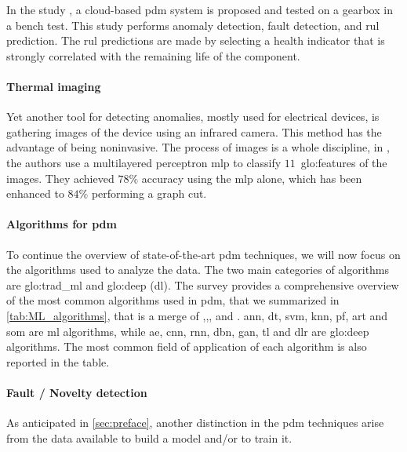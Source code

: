 In the study \cite{calabreseRUL}, a cloud-based \gls{pdm} system is proposed and tested on a gearbox in a bench test. This study performs anomaly detection, fault detection, and \gls{rul} prediction. The \gls{rul} predictions are made by selecting a health indicator that is strongly correlated with the remaining life of the component.


\paragraph{Thermal imaging}
Yet another tool for detecting anomalies, mostly used for electrical devices, is gathering images of the device using an infrared camera. This method has the advantage of being noninvasive. The process of images is a whole discipline, in \cite{Thermography}, the authors use a multilayered perceptron \gls{mlp} to classify $11$~\gls{glo:feature}s of the images. They achieved $78\%$ accuracy using the \gls{mlp} alone, which has been enhanced to $84\%$ performing a graph cut.

\paragraph{Algorithms for \gls{pdm}}
To continue the overview of state-of-the-art \gls{pdm} techniques, we will now focus on the algorithms used to analyze the data. The two main categories of algorithms are \gls{glo:trad_ml} and \gls{glo:deep} (\gls{dl}).  The survey \cite{ran2019survey} provides a comprehensive overview of the most common algorithms used in \gls{pdm}, that we summarized in \autoref{tab:ML_algorithms}, that is a merge of \cite{ran2019survey},\cite{particlefilter},\cite{yang2018particle},\cite{VONBIRGELEN2018480} and \cite{lira2011adaptive}. \gls{ann}, \gls{dt}, \gls{svm}, \gls{knn}, \gls{pf}, \gls{art} and \gls{som} are \gls{ml} algorithms, while \gls{ae}, \gls{cnn}, \gls{rnn}, \gls{dbn}, \gls{gan}, \gls{tl} and \gls{dlr} are \gls{glo:deep} algorithms. The most common field of application of each algorithm is also reported in the table.



\paragraph*{Fault / Novelty detection}

As anticipated in \autoref{sec:preface}, another distinction in the \gls{pdm} techniques arise from the data available to build a model and/or to train it.

